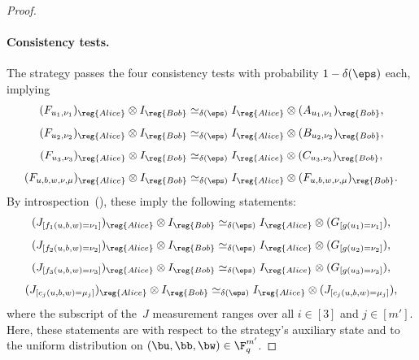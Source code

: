 \begin{proof}
\paragraph{Consistency tests.}
The strategy passes the four consistency tests with probability $1-\delta(\eps)$ each, implying
\begin{equation*}
(F_{u_1, \nu_1})_{\reg{Alice}} \otimes I_{\reg{Bob}} \simeq_{\delta(\eps)} I_{\reg{Alice}} \otimes (A_{u_1, \nu_1})_{\reg{Bob}},
\end{equation*}
\begin{equation*}
(F_{u_2, \nu_2})_{\reg{Alice}} \otimes I_{\reg{Bob}} \simeq_{\delta(\eps)} I_{\reg{Alice}} \otimes (B_{u_2, \nu_2})_{\reg{Bob}},
\end{equation*}
\begin{equation*}
(F_{u_3, \nu_3})_{\reg{Alice}} \otimes I_{\reg{Bob}} \simeq_{\delta(\eps)} I_{\reg{Alice}} \otimes (C_{u_3, \nu_3})_{\reg{Bob}},
\end{equation*}
\begin{equation*}
(F_{u, b, w, \nu, \mu})_{\reg{Alice}} \otimes I_{\reg{Bob}} \simeq_{\delta(\eps)} I_{\reg{Alice}} \otimes (F_{u, b, w, \nu, \mu})_{\reg{Bob}}.
\end{equation*}
By introspection~(), these imply the following statements:
\begin{equation*}
(J_{[f_1(u, b, w) = \nu_1]})_{\reg{Alice}} \otimes I_{\reg{Bob}} \simeq_{\delta(\eps)} I_{\reg{Alice}} \otimes (G_{[g(u_1) = \nu_1]}),
\end{equation*}
\begin{equation*}
(J_{[f_2(u, b, w) = \nu_2]})_{\reg{Alice}} \otimes I_{\reg{Bob}} \simeq_{\delta(\eps)} I_{\reg{Alice}} \otimes (G_{[g(u_2) = \nu_2]}),
\end{equation*}
\begin{equation*}
(J_{[f_3(u, b, w) = \nu_3]})_{\reg{Alice}} \otimes I_{\reg{Bob}} \simeq_{\delta(\eps)} I_{\reg{Alice}} \otimes (G_{[g(u_3) = \nu_3]}),
\end{equation*}
\begin{equation*}
(J_{[c_j(u, b, w) = \mu_j]})_{\reg{Alice}} \otimes I_{\reg{Bob}} \simeq_{\delta(\eps)} I_{\reg{Alice}} \otimes (J_{[c_j(u, b, w) = \mu_j]}),
\end{equation*}
where the subscript of the~$J$ measurement ranges over all $i \in [3]$ and $j \in [m']$.
Here, these statements are with respect to the strategy's auxiliary state and to the uniform distribution on $(\bu, \bb, \bw) \in \F_q^{m'}$.


\end{proof}
